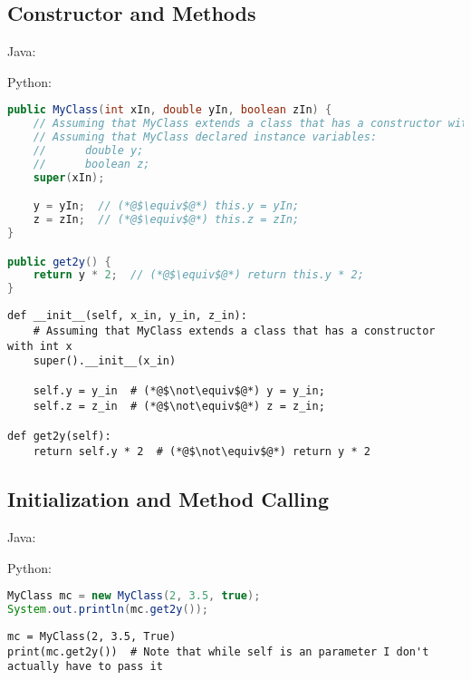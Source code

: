 \documentclass{article}
\begin{document}
\subsection{Constructor and Methods}
\begin{minipage}{0.45\linewidth}
    Java:
\end{minipage}
\hfill
\begin{minipage}{0.45\linewidth}
    Python:
\end{minipage}

\begin{minipage}{0.45\linewidth}
    \begin{lstlisting}[language=Java]
public MyClass(int xIn, double yIn, boolean zIn) {
    // Assuming that MyClass extends a class that has a constructor with int x
    // Assuming that MyClass declared instance variables:
    //      double y;
    //      boolean z;
    super(xIn);

    y = yIn;  // (*@$\equiv$@*) this.y = yIn;
    z = zIn;  // (*@$\equiv$@*) this.z = zIn;
}

public get2y() {
    return y * 2;  // (*@$\equiv$@*) return this.y * 2;
}
     \end{lstlisting}
\end{minipage}
\hfill
\begin{minipage}{0.45\linewidth}
    \begin{lstlisting}
def __init__(self, x_in, y_in, z_in):
    # Assuming that MyClass extends a class that has a constructor with int x
    super().__init__(x_in)

    self.y = y_in  # (*@$\not\equiv$@*) y = y_in;
    self.z = z_in  # (*@$\not\equiv$@*) z = z_in;

def get2y(self):
    return self.y * 2  # (*@$\not\equiv$@*) return y * 2
    \end{lstlisting}
\end{minipage}

\subsection{Initialization and Method Calling}
\begin{minipage}{0.45\linewidth}
    Java:
\end{minipage}
\hfill
\begin{minipage}{0.45\linewidth}
    Python:
\end{minipage}

\begin{minipage}{0.45\linewidth}
    \begin{lstlisting}[language=Java]
MyClass mc = new MyClass(2, 3.5, true);
System.out.println(mc.get2y());
     \end{lstlisting}
\end{minipage}
\hfill
\begin{minipage}{0.45\linewidth}
    \begin{lstlisting}
mc = MyClass(2, 3.5, True)
print(mc.get2y())  # Note that while self is an parameter I don't actually have to pass it
    \end{lstlisting}
\end{minipage}
\end{document}

